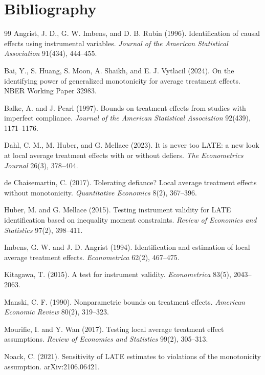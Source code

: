 \documentclass[11pt]{article}
\theoremstyle{definition}
\theoremstyle{plain}
\theoremstyle{remark}
\begin{document}
\section*{Bibliography}
\begin{thebibliography}{99}
Angrist, J. D., G. W. Imbens, and D. B. Rubin (1996).
Identification of causal effects using instrumental variables.
\emph{Journal of the American Statistical Association} 91(434), 444--455.

Bai, Y., S. Huang, S. Moon, A. Shaikh, and E. J. Vytlacil (2024).
On the identifying power of generalized monotonicity for average treatment effects.
NBER Working Paper 32983.

Balke, A. and J. Pearl (1997).
Bounds on treatment effects from studies with imperfect compliance.
\emph{Journal of the American Statistical Association} 92(439), 1171--1176.

Dahl, C. M., M. Huber, and G. Mellace (2023).
It is never too LATE: a new look at local average treatment effects with or without defiers.
\emph{The Econometrics Journal} 26(3), 378--404.

de Chaisemartin, C. (2017).
Tolerating defiance? Local average treatment effects without monotonicity.
\emph{Quantitative Economics} 8(2), 367--396.

Huber, M. and G. Mellace (2015).
Testing instrument validity for LATE identification based on inequality moment constraints.
\emph{Review of Economics and Statistics} 97(2), 398--411.

Imbens, G. W. and J. D. Angrist (1994).
Identification and estimation of local average treatment effects.
\emph{Econometrica} 62(2), 467--475.

Kitagawa, T. (2015).
A test for instrument validity.
\emph{Econometrica} 83(5), 2043--2063.

Manski, C. F. (1990).
Nonparametric bounds on treatment effects.
\emph{American Economic Review} 80(2), 319--323.

Mourifie, I. and Y. Wan (2017).
Testing local average treatment effect assumptions.
\emph{Review of Economics and Statistics} 99(2), 305--313.

Noack, C. (2021).
Sensitivity of LATE estimates to violations of the monotonicity assumption.
arXiv:2106.06421.
\end{thebibliography}
\end{document}
